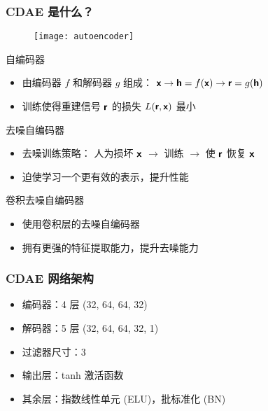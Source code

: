 \documentclass{beamer}
\begin{document}
\begin{frame}[subsec]
  \frametitle{CDAE 是什么？}
  \begin{figure}
    \centering
    \texttt{[image: autoencoder]}
  \end{figure}
  \vspace{-0.8ex}
  \begin{alertblock}{自编码器}
    \vspace{-0.5ex}
    \begin{itemize}
      \item 由编码器 $f$ 和解码器 $g$ 组成：
        $\bm{\mathsf{x}} \rightarrow \bm{\mathsf{h}} = f(\bm{\mathsf{x}}) \rightarrow \bm{\mathsf{r}} = g(\bm{\mathsf{h}})$
      \item 训练使得重建信号 $\bm{\mathsf{r}}$ 的损失 $L(\bm{\mathsf{r}}, \bm{\mathsf{x}})$ 最小
    \end{itemize}
  \end{alertblock}
  \vspace{-0.3ex}
  \begin{alertblock}{去噪自编码器}
    \vspace{-0.5ex}
    \begin{itemize}
      \item 去噪训练策略：
        人为损坏 $\bm{\mathsf{x}}$ $\rightarrow$
        训练 $\rightarrow$ 使 $\bm{\mathsf{r}}$ 恢复 $\bm{\mathsf{x}}$
      \item 迫使学习一个更有效的表示，提升性能
    \end{itemize}
  \end{alertblock}
  \vspace{-0.3ex}
  \begin{alertblock}{卷积去噪自编码器}
    \vspace{-0.5ex}
    \begin{itemize}
      \item 使用卷积层的去噪自编码器
      \item 拥有更强的特征提取能力，提升去噪能力
    \end{itemize}
  \end{alertblock}
\end{frame}

\begin{frame}[subsec]
  \frametitle{CDAE 网络架构}
  \begin{itemize}
    \item 编码器：4 层 (32, 64, 64, 32)
    \item 解码器：5 层 (32, 64, 64, 32, 1)
    \item 过滤器尺寸：3
    \item 输出层：\alert{tanh} 激活函数
    \item 其余层：\alert{指数线性单元} (ELU)，\alert{批标准化} (BN)
  \end{itemize}

  \begin{figure}
  \end{figure}
\end{frame}
\end{document}
